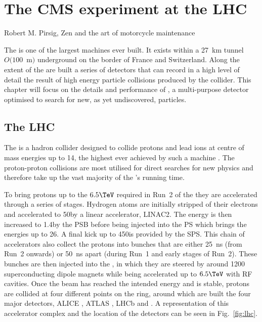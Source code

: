 \chapter{The CMS experiment at the LHC}
\label{chap:detector}

%
{Robert M. Pirsig, Zen and the art of motorcycle maintenance}

The \LHC is one of the largest machines ever built. It exists within a
27~km tunnel $O(100$~m$)$ underground on the border of France and
Switzerland. Along the extent of the \LHC are built a series of
detectors that can record in a high level of detail the result of high
energy particle collisions produced by the collider. This chapter
will focus on the details and performance of \CMS, a multi-purpose
detector optimised to search for new, as yet undiscovered, particles.

\section{The LHC}
\label{sec:lhc}

The \LHC is a hadron collider designed to collide protons and lead
ions at centre of mass energies up to 14\tev, the highest ever achieved by such a
machine
\cite{Evans:2008zzb,CERN-2004-003-V-1,CERN-2004-003-V-2,CERN-2004-003-V-3}.
The proton-proton collisions are most utilised for direct searches for
new physics and therefore take up the vast majority of the \LHC's
running time. 

To bring protons up to the $6.5\tev$ required in Run~2 of the \LHC they are
accelerated through a series of stages. Hydrogen atoms are initially stripped
of their electrons and accelerated to 50\mev by a linear accelerator,
\ac{LINAC2}. The energy is then increased to 1.4\gev by the \ac{PSB} before
being injected into the \ac{PS} which brings the energies up to 26\gev. A final
kick up to 450\gev is provided by the \ac{SPS}. This chain of accelerators also
collect the protons into bunches that are either 25~ns (from Run~2 onwards) or
50~ns apart (during Run~1 and early stages of Run~2). These bunches are then
injected into the \LHC, in which they are steered by around 1200
superconducting dipole magnets while being accelerated up to $6.5\tev$ with
\ac{RF} cavities. Once the beam has reached the intended energy and is stable,
protons are collided at four different points on the ring, around which are
built the four major \LHC detectors, ALICE \cite{Aamodt:2008zz}, ATLAS
\cite{Aad:2008zzm}, LHCb \cite{Alves:2008zz} and \CMS \cite{Chatrchyan:2008aa}.
A representation of this accelerator complex and the location of the
detectors can be seen in Fig.~\ref{fig:lhc}.

